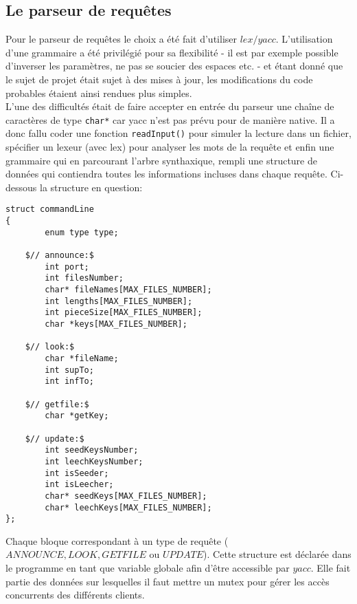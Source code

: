 \subsection{Le parseur de requêtes}
Pour le parseur de requêtes le choix a été fait d'utiliser $lex/yacc$. L'utilisation d'une grammaire a été privilégié pour sa flexibilité - il est par exemple possible d'inverser les paramètres, ne pas se soucier des espaces etc. - et étant donné que le sujet de projet était sujet à des mises à jour, les modifications du code probables étaient ainsi rendues plus simples.\\
L'une des difficultés était de faire accepter en entrée du parseur une chaîne de caractères de type \texttt{char*} car yacc n'est pas prévu pour de manière native. Il a donc fallu coder une fonction \texttt{readInput()} pour simuler la lecture dans un fichier, spécifier un lexeur (avec lex) pour analyser les mots de la requête et enfin une grammaire qui en parcourant l'arbre synthaxique, rempli une structure de données qui contiendra toutes les informations incluses dans chaque requête. Ci-dessous la structure en question:

\begin{verbatim}
struct commandLine
{
        enum type type;

	$// announce:$
        int port;
        int filesNumber;
        char* fileNames[MAX_FILES_NUMBER];
        int lengths[MAX_FILES_NUMBER];
        int pieceSize[MAX_FILES_NUMBER];
        char *keys[MAX_FILES_NUMBER];

	$// look:$
        char *fileName;
        int supTo;
        int infTo;

	$// getfile:$
        char *getKey;

	$// update:$
        int seedKeysNumber;
        int leechKeysNumber;
        int isSeeder;
        int isLeecher;
        char* seedKeys[MAX_FILES_NUMBER];
        char* leechKeys[MAX_FILES_NUMBER];
};
\end{verbatim}

Chaque bloque correspondant à un type de requête ($ANNOUNCE, LOOK, GETFILE$ ou $UPDATE$).
Cette structure est déclarée dans le programme en tant que variable globale afin d'être accessible par $yacc$. Elle fait partie des données sur lesquelles il faut mettre un mutex pour gérer les accès concurrents des différents clients.






















